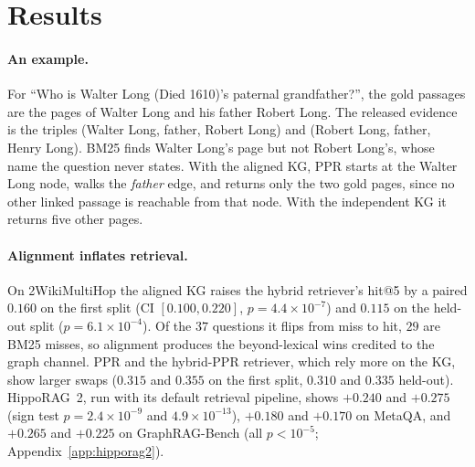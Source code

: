 \documentclass[11pt]{article}
\begin{document}
\begin{table}[!t]\centering\footnotesize
\setlength{\tabcolsep}{3pt}
\resizebox{\textwidth}{!}{}
\caption{Controlled KG swap and de-circularized evaluation. Left: hit@5 on the first split with the gold-aligned KG (aligned), the independent OpenIE KG (indep.), and BM25, and the paired hit@5 swap on the held-out split. Middle: answer accuracy of Qwen2.5-14B given each retriever's top five passages (alias-aware EM; judge accuracy on GraphRAG-Bench), with closed-book and gold-only accuracy. Right: paired per-question swap in answer accuracy, aligned minus independent, for both readers and splits; exact two-sided sign test, $^{*}p<0.05$, $^{**}p<0.01$ uncorrected; $^{\dagger}$significant after Holm correction over the $48$-cell grid.}
\label{tab:e2e}
\end{table}

\section{Results}
\label{sec:results}
\paragraph{An example.} For ``Who is Walter Long (Died 1610)'s paternal grandfather?'', the gold passages are the pages of Walter Long and his father Robert Long. The released evidence is the triples (Walter Long, father, Robert Long) and (Robert Long, father, Henry Long). BM25 finds Walter Long's page but not Robert Long's, whose name the question never states. With the aligned KG, PPR starts at the Walter Long node, walks the \emph{father} edge, and returns only the two gold pages, since no other linked passage is reachable from that node. With the independent KG it returns five other pages.
\paragraph{Alignment inflates retrieval.} On 2WikiMultiHop the aligned KG raises the hybrid retriever's hit@5 by a paired $0.160$ on the first split (CI $[0.100,0.220]$, $p=4.4\times10^{-7}$) and $0.115$ on the held-out split ($p=6.1\times10^{-4}$). Of the $37$ questions it flips from miss to hit, $29$ are BM25 misses, so alignment produces the beyond-lexical wins credited to the graph channel. PPR and the hybrid-PPR retriever, which rely more on the KG, show larger swaps ($0.315$ and $0.355$ on the first split, $0.310$ and $0.335$ held-out). HippoRAG~2, run with its default retrieval pipeline, shows $+0.240$ and $+0.275$ (sign test $p=2.4\times10^{-9}$ and $4.9\times10^{-13}$), $+0.180$ and $+0.170$ on MetaQA, and $+0.265$ and $+0.225$ on GraphRAG-Bench (all $p<10^{-5}$; Appendix~\ref{app:hipporag2}).
\end{document}
